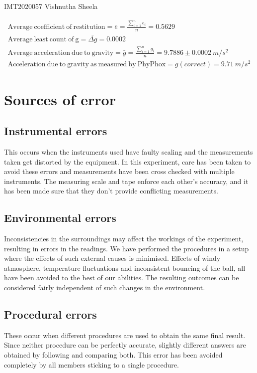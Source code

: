 \documentclass{article}
\begin{document}
\begin{sloppypar}
\begin{center}
   IMT2020057 Vishnutha Sheela
\end{center}

\begin{gather*}
    \mathrm{Average \ coefficient \ of \ restitution} = \bar{e} = \frac{\sum^{n}_{i=1}e_i} {n} = 0.5629 \\
    \mathrm{ Average \ least \ count \ of \ g} = \bar{\Delta g} = 0.0002 \\ 
    \mathrm{Average \ acceleration \ due \ to \ gravity} = \bar{g} = \frac{\sum^{n}_{i=1}g_i} {n} = 9.7886 \pm 0.0002 \ m/s^2 \\
    \mathrm{Acceleration \ due \ to \ gravity \ as \ measured \ by \ PhyPhox} = g(correct) = 9.71 \ m/s^2
\end{gather*}



\section{Sources of error}
\subsection{Instrumental errors}
 This occurs when the instruments used have faulty scaling and the measurements taken get distorted by the equipment. In this experiment, care has been taken to avoid these errors and measurements have been cross checked with multiple instruments. The measuring scale and tape enforce each other's accuracy, and it has been made sure that they don't provide conflicting measurements.
\subsection{Environmental errors}
Inconsistencies in the surroundings may affect the workings of the experiment, resulting in errors in the readings. We have performed the procedures in a setup where the effects of such external causes is minimised. Effects of windy atmosphere, temperature fluctuations and inconsistent bouncing of the ball, all have been avoided to the best of our abilities. The resulting outcomes can be considered fairly independent of such changes in the environment.
\subsection{Procedural errors}
These occur when different procedures are used to obtain the same final result. Since neither procedure can be perfectly accurate, slightly different answers are obtained by following and comparing both. This error has been avoided completely by all members sticking to a single procedure.

\end{sloppypar}
\end{document}
